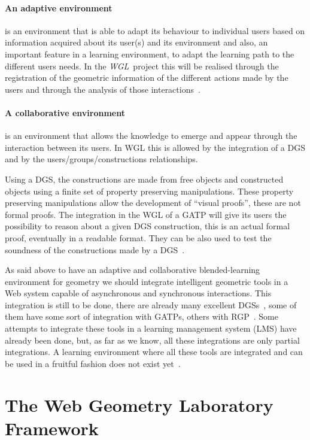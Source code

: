 \documentclass{llncs}
\newcommand{\WGL}{{\em WGL}}
\begin{document}
\paragraph{An adaptive environment} is an environment that is able to
adapt its behaviour to individual users based on information acquired
about its user(s) and its environment and also, an important feature
in a learning environment, to adapt the learning path to the different
users needs. In the \WGL\ project this will be realised through the
registration of the geometric information of the different actions
made by the users and through the analysis of those
interactions~\cite{Quaresma2012b}.

\paragraph{A collaborative environment} is an environment that allows
the knowledge to emerge and appear through the interaction between its
users. In WGL this is allowed by the integration of a DGS and by the
users/groups/constructions relationships.

Using a DGS, the constructions are made from free objects
and constructed objects using a finite set of property preserving
manipulations. These property preserving manipulations allow the
development of ``visual proofs'', these are not formal proofs. The
integration in the WGL of a GATP will give its users the possibility
to reason about a given DGS construction, this is an actual formal
proof, eventually in a readable format. They can be also used to test
the soundness of the constructions made by a
DGS~\cite{Janicic2010,Janicic2007}.

As said above to have an adaptive and collaborative blended-learning
environment for geometry we should integrate intelligent geometric
tools in a Web system capable of asynchronous and synchronous
interactions. This integration is still to be done, there are
already many excellent DGSs~\cite{wikipedia2013}, some of them have
some sort of integration with GATPs, others with
RGP~\cite{Janicic2010,Quaresma06d}. Some attempts to integrate these
tools in a learning management system (LMS) have already been done,
but, as far as we know, all these integrations are only partial
integrations. A learning environment where all these tools are
integrated and can be used in a fruitful fashion does not exist
yet~\cite{Santos2013}.


\section{The Web Geometry Laboratory Framework}
\label{sec:CollaborativeEnvironmentForGeometry}
\end{document}
